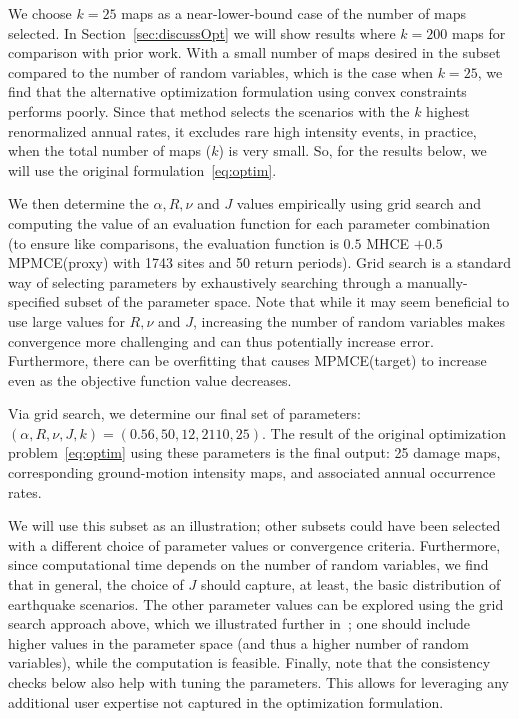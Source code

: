 We choose $k=25$ maps as a near-lower-bound case of the number of maps selected. In Section~\ref{sec:discussOpt} we will show results where $k=200$ maps for comparison with prior work.
With a small number of maps desired in the subset compared to the number of random variables, which is the case when $k=25$, we find that the alternative optimization formulation using convex constraints performs poorly. Since that method selects the scenarios with the $k$ highest renormalized annual rates, it excludes rare high intensity events, in practice, when the total number of maps ($k$) is very small. So, for the results below, we will use the original formulation~\eqref{eq:optim}. 


We then determine the $\alpha, R, \nu$ and $J$ values empirically using grid search and computing the value of an evaluation function for each parameter combination (to ensure like comparisons, the evaluation function is $0.5$ MHCE $+ 0.5$ MPMCE(proxy) with 1743 sites and 50 return periods).  Grid search is a standard way of selecting parameters by exhaustively searching through a manually-specified subset of the parameter space. Note that while it may seem beneficial to use large values for $R, \nu$ and $J$, increasing the number of random variables makes convergence more challenging and can thus potentially increase error. Furthermore, there can be overfitting that causes MPMCE(target) to increase even as the objective function value decreases.


Via grid search, we determine our final set of parameters: $(\alpha, R, \nu, J, k) = (0.56, 50, 12, 2110, 25)$. The result of the original optimization problem~\eqref{eq:optim} using these parameters is the final output:  25 damage maps, corresponding ground-motion intensity maps, and associated annual occurrence rates. 

We will use this subset as an illustration; other subsets could have been selected with a different choice of parameter values or convergence criteria.  Furthermore, since computational time depends on the number of random variables, we find that in general, the choice of $J$ should capture, at least, the basic distribution of earthquake scenarios. The other parameter values can be explored using the grid search approach above, which we illustrated further in~\cite{miller_framework_2014}; one should include higher values in the parameter space (and thus a higher number of random variables), while the computation is feasible. Finally, note that the consistency checks below also help with tuning the parameters. This allows for leveraging any additional user expertise not  captured in the optimization formulation.


